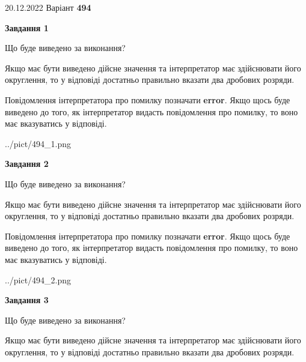 \documentclass[12pt, ukrainian]{article}
\begin{document}
{20.12.2022 Варіант \No \textbf { 494 }\par}
{
\begin {Large}

{\begin {center}\textbf{Завдання 1}\end {center}}\par
Що буде виведено за виконання? \par

Якщо має бути виведено дійсне значення та інтерпретатор має здійснювати його округлення, 
то у відповіді достатньо правильно вказати два дробових розряди.

Повідомлення інтерпретатора про помилку позначати \textbf{error}.
Якщо щось буде виведено до того, як інтерпретатор видасть повідомлення про помилку, 
то воно має вказуватись у відповіді. \par

\begin{center}
	{../pict/494_1.png}
\end{center}
\newpage

{\begin {center}\textbf{Завдання 2}\end {center}}\par
Що буде виведено за виконання? \par

Якщо має бути виведено дійсне значення та інтерпретатор має здійснювати його округлення, 
то у відповіді достатньо правильно вказати два дробових розряди.

Повідомлення інтерпретатора про помилку позначати \textbf{error}.
Якщо щось буде виведено до того, як інтерпретатор видасть повідомлення про помилку, 
то воно має вказуватись у відповіді. \par

\begin{center}
	{../pict/494_2.png}
\end{center}
\newpage

{\begin {center}\textbf{Завдання 3}\end {center}}\par
Що буде виведено за виконання? \par

Якщо має бути виведено дійсне значення та інтерпретатор має здійснювати його округлення, 
то у відповіді достатньо правильно вказати два дробових розряди.


\end{Large}}
\end{document}
